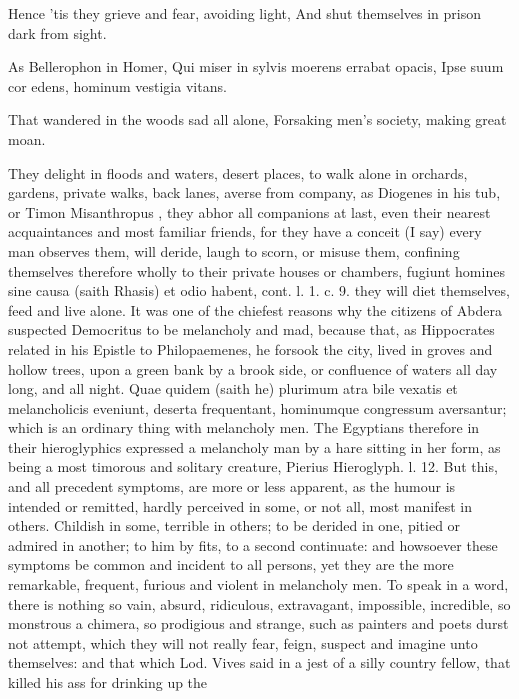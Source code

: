 {Hence 'tis they grieve and fear, avoiding light,
And shut themselves in prison dark from sight.

As Bellerophon in Homer,
Qui miser in sylvis moerens errabat opacis,
Ipse suum cor edens, hominum vestigia vitans.

That wandered in the woods sad all alone,
Forsaking men's society, making great moan.

They delight in floods and waters, desert places, to walk alone in
orchards, gardens, private walks, back lanes, averse from company, as
Diogenes in his tub, or Timon Misanthropus , they abhor all
companions at last, even their nearest acquaintances and most familiar
friends, for they have a conceit (I say) every man observes them, will
deride, laugh to scorn, or misuse them, confining themselves therefore
wholly to their private houses or chambers, fugiunt homines sine causa
(saith Rhasis) et odio habent, cont. l. 1. c. 9. they will diet
themselves, feed and live alone. It was one of the chiefest reasons why
the citizens of Abdera suspected Democritus to be melancholy and mad,
because that, as Hippocrates related in his Epistle to Philopaemenes,
he forsook the city, lived in groves and hollow trees, upon a
green bank by a brook side, or confluence of waters all day long, and
all night. Quae quidem (saith he) plurimum atra bile vexatis et
melancholicis eveniunt, deserta frequentant, hominumque congressum
aversantur; which is an ordinary thing with melancholy men. The
Egyptians therefore in their hieroglyphics expressed a melancholy man
by a hare sitting in her form, as being a most timorous and solitary
creature, Pierius Hieroglyph. l. 12. But this, and all precedent
symptoms, are more or less apparent, as the humour is intended or
remitted, hardly perceived in some, or not all, most manifest in
others. Childish in some, terrible in others; to be derided in one,
pitied or admired in another; to him by fits, to a second continuate:
and howsoever these symptoms be common and incident to all persons, yet
they are the more remarkable, frequent, furious and violent in
melancholy men. To speak in a word, there is nothing so vain, absurd,
ridiculous, extravagant, impossible, incredible, so monstrous a
chimera, so prodigious and strange, such as painters and poets
durst not attempt, which they will not really fear, feign, suspect and
imagine unto themselves: and that which Lod. Vives said in a jest
of a silly country fellow, that killed his ass for drinking up the
}
